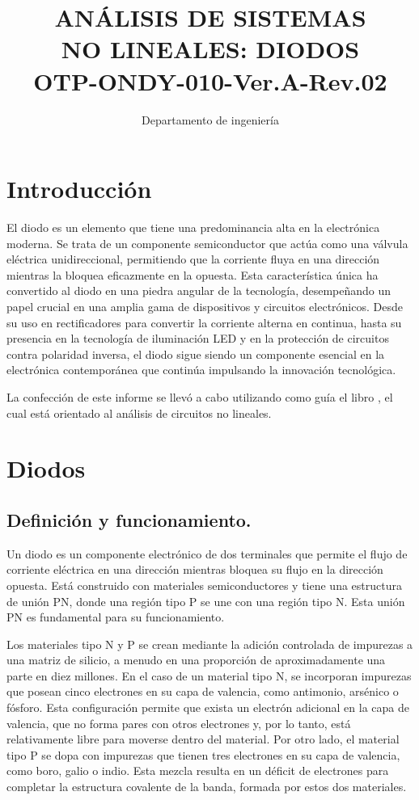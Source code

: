 \documentclass[isoft]{ssltexposter}
\title{\uppercase{Análisis de sistemas \\ no lineales: Diodos} \\ \small{OTP-ONDY-010-Ver.A-Rev.02}}
\author{Departamento de ingeniería}
\begin{document}
    \begin{poster}

\cfoot{\thepage} 
\section{Introducción}
El diodo es un elemento que tiene una predominancia alta en la electrónica moderna. Se trata de un componente semiconductor que actúa como una válvula eléctrica unidireccional, permitiendo que la corriente fluya en una dirección mientras la bloquea eficazmente en la opuesta. Esta característica única ha convertido al diodo en una piedra angular de la tecnología, desempeñando un papel crucial en una amplia gama de dispositivos y circuitos electrónicos. Desde su uso en rectificadores para convertir la corriente alterna en continua, hasta su presencia en la tecnología de iluminación LED y en la protección de circuitos contra polaridad inversa, el diodo sigue siendo un componente esencial en la electrónica contemporánea que continúa impulsando la innovación tecnológica.

La confección de este informe se llevó a cabo utilizando como guía el libro \cite{teoria_circuitos_boylestad}, el cual está orientado al análisis de circuitos no lineales. 

\section{Diodos}

\subsection{Definición y funcionamiento.}
Un diodo es un componente electrónico de dos terminales que permite el flujo de corriente eléctrica en una dirección mientras bloquea su flujo en la dirección opuesta. Está construido con materiales semiconductores y tiene una estructura de unión PN, donde una región tipo P se une con una región tipo N. Esta unión PN es fundamental para su funcionamiento.

Los materiales tipo N y P se crean mediante la adición controlada de impurezas a una matriz de silicio, a menudo en una proporción de aproximadamente una parte en diez millones. En el caso de un material tipo N, se incorporan impurezas que posean cinco electrones en su capa de valencia, como antimonio, arsénico o fósforo. Esta configuración permite que exista un electrón adicional en la capa de valencia, que no forma pares con otros electrones y, por lo tanto, está relativamente libre para moverse dentro del material. Por otro lado, el material tipo P se dopa con impurezas que tienen tres electrones en su capa de valencia, como boro, galio o indio. Esta mezcla resulta en un déficit de electrones para completar la estructura covalente de la banda, formada por estos dos materiales.



\end{poster}
\end{document}
